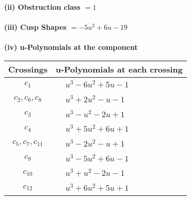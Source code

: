 \documentclass[1p]{elsarticle_modified}
\theoremstyle{definition}
\begin{document}
\flushleft \textbf{(ii) Obstruction class $= 1$}\\~\\
\flushleft \textbf{(iii) Cusp Shapes $= -5 u^2+6 u-19$}\\~\\
\newpage\renewcommand{\arraystretch}{1}
\flushleft \textbf{(iv) u-Polynomials at the component}\newline \\
\begin{tabular}{m{50pt}|m{274pt}}
Crossings & \hspace{64pt}u-Polynomials at each crossing \\
\hline $$\begin{aligned}c_{1}\end{aligned}$$&$\begin{aligned}
&u^3-6 u^2+5 u-1
\end{aligned}$\\
\hline $$\begin{aligned}c_{2},c_{6},c_{8}\end{aligned}$$&$\begin{aligned}
&u^3+2 u^2- u-1
\end{aligned}$\\
\hline $$\begin{aligned}c_{3}\end{aligned}$$&$\begin{aligned}
&u^3- u^2-2 u+1
\end{aligned}$\\
\hline $$\begin{aligned}c_{4}\end{aligned}$$&$\begin{aligned}
&u^3+5 u^2+6 u+1
\end{aligned}$\\
\hline $$\begin{aligned}c_{5},c_{7},c_{11}\end{aligned}$$&$\begin{aligned}
&u^3-2 u^2- u+1
\end{aligned}$\\
\hline $$\begin{aligned}c_{9}\end{aligned}$$&$\begin{aligned}
&u^3-5 u^2+6 u-1
\end{aligned}$\\
\hline $$\begin{aligned}c_{10}\end{aligned}$$&$\begin{aligned}
&u^3+u^2-2 u-1
\end{aligned}$\\
\hline $$\begin{aligned}c_{12}\end{aligned}$$&$\begin{aligned}
&u^3+6 u^2+5 u+1
\end{aligned}$\\
\hline
\end{tabular}\\~\\
\end{document}
